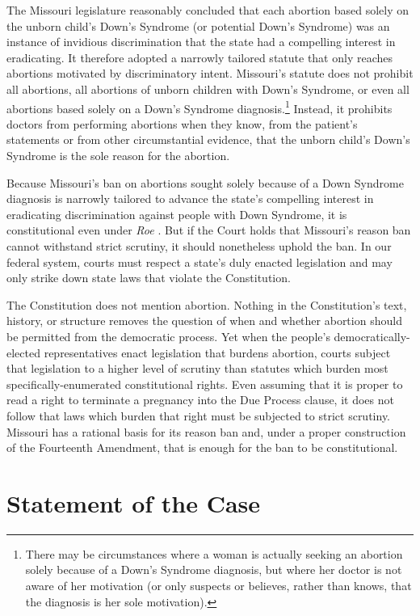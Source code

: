 \documentclass[12pt,\documentclassflag]{SCOTUS_Brief}
\begin{document}
The Missouri legislature reasonably concluded that each abortion based solely on the unborn child's Down's Syndrome (or potential Down's Syndrome) was an instance of invidious discrimination that the state had a compelling interest in eradicating. It therefore adopted a narrowly tailored statute that only reaches abortions motivated by discriminatory intent. Missouri's statute does not prohibit all abortions, all abortions of unborn children with Down's Syndrome, or even all abortions based solely on a Down's Syndrome diagnosis.\footnote{There may be circumstances where a woman is actually seeking an abortion solely because of a Down's Syndrome diagnosis, but where her doctor is not aware of her motivation (or only suspects or believes, rather than knows, that the diagnosis is her sole motivation).} Instead, it prohibits doctors from performing abortions when they know, from the patient's statements or from other circumstantial evidence, that the unborn child's Down's Syndrome is the sole reason for the abortion.

Because Missouri's ban on abortions sought solely because of a Down Syndrome diagnosis is narrowly tailored to advance the state's compelling interest in eradicating discrimination against people with Down Syndrome, it is constitutional even under \textit{Roe} \cite[!]{Roe}. But if the Court holds that Missouri's reason ban cannot withstand strict scrutiny, it should nonetheless uphold the ban. In our federal system, courts must respect a state's duly enacted legislation and may only strike down state laws that violate the Constitution.

The Constitution does not mention abortion. Nothing in the Constitution's text, history, or structure removes the question of when and whether abortion should be permitted from the democratic process. Yet when the people's democratically-elected representatives enact legislation that burdens abortion, courts subject that legislation to a higher level of scrutiny than statutes which burden most specifically-enumerated constitutional rights. Even assuming that it is proper to read a right to terminate a pregnancy into the Due Process clause, it does not follow that laws which burden that right must be subjected to strict scrutiny. Missouri has a rational basis for its reason ban and, under a proper construction of the Fourteenth Amendment, that is enough for the ban to be constitutional.

\section{Statement of the Case}
\end{document}
